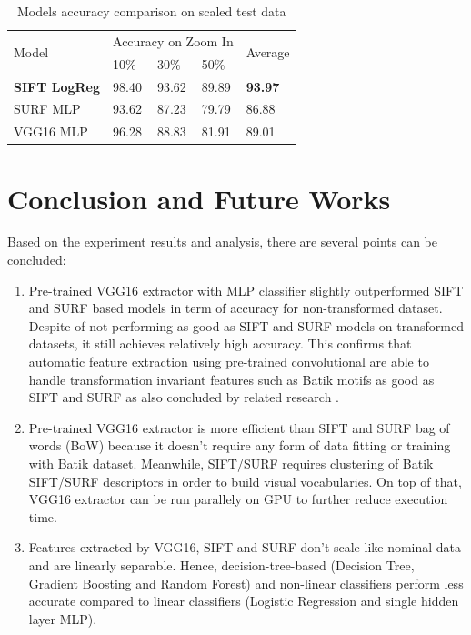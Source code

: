 \documentclass[conference, compsoc]{IEEEtran}
\begin{document}
\begin{table}[t]
	\begin{center}
		\caption{Models accuracy comparison on scaled test data}
		\label{tab_experiment_scaled}	
		\begin{tabular}{lllll}
		    \toprule
			\multirow{2}{*}[-3pt]{Model}  & \multicolumn{3}{c}{Accuracy on Zoom In} & \multirow{2}{*}[-3pt]{Average} \\ 
		    \cmidrule{2-4} 
		  & 10\% & 30\% & 50\% & \\ 
		     \midrule
\textbf{SIFT LogReg} & 98.40 & 93.62 & 89.89 & \textbf{93.97} \\
SURF MLP & 93.62 & 87.23 & 79.79 & 86.88 \\
VGG16 MLP & 96.28 & 88.83 & 81.91 & 89.01 \\
		    \bottomrule
		\end{tabular}
	\end{center}
\end{table} 

\section{Conclusion and Future Works}

Based on the experiment results and analysis, there are several points can be concluded:

\begin{enumerate}
	\item Pre-trained VGG16 extractor with MLP classifier slightly outperformed SIFT and SURF based models in term of accuracy for non-transformed dataset. Despite of not performing as good as SIFT and SURF models on transformed datasets, it still achieves relatively high accuracy. This confirms that automatic feature extraction using pre-trained convolutional are able to handle transformation invariant features such as Batik motifs as good as SIFT and SURF as also concluded by related research \cite{fischer2014descriptor}.
	\item Pre-trained VGG16 extractor is more efficient than SIFT and SURF bag of words (BoW) because it doesn't require any form of data fitting or training with Batik dataset. Meanwhile, SIFT/SURF requires clustering of Batik SIFT/SURF descriptors in order to build visual vocabularies. On top of that, VGG16 extractor can be run parallely on GPU to further reduce execution time.
	\item Features extracted by VGG16, SIFT and SURF don't scale like nominal data and are linearly separable. Hence, decision-tree-based (Decision Tree, Gradient Boosting and Random Forest) and non-linear classifiers perform less accurate compared to linear classifiers (Logistic Regression and single hidden layer MLP).
\end{enumerate}
\end{document}

